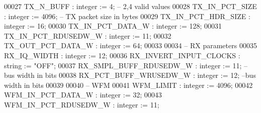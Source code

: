 \begin{DoxyCode}
00027       \textcolor{vhdlchar}{TX_N_BUFF}               \textcolor{vhdlchar}{:} \textcolor{comment}{integer} \textcolor{vhdlchar}{:=} \textcolor{vhdllogic}{}\textcolor{vhdllogic}{4};\textcolor{keyword}{ -- 2,4 valid values}
00028       \textcolor{vhdlchar}{TX_IN_PCT_SIZE}          \textcolor{vhdlchar}{:} \textcolor{comment}{integer} \textcolor{vhdlchar}{:=} \textcolor{vhdllogic}{}\textcolor{vhdllogic}{4096};\textcolor{keyword}{ -- TX packet size in bytes}
00029       \textcolor{vhdlchar}{TX_IN_PCT_HDR_SIZE}      \textcolor{vhdlchar}{:} \textcolor{comment}{integer} \textcolor{vhdlchar}{:=} \textcolor{vhdllogic}{}\textcolor{vhdllogic}{16};
00030       \textcolor{vhdlchar}{TX_IN_PCT_DATA_W}        \textcolor{vhdlchar}{:} \textcolor{comment}{integer} \textcolor{vhdlchar}{:=} \textcolor{vhdllogic}{}\textcolor{vhdllogic}{128};
00031       \textcolor{vhdlchar}{TX_IN_PCT_RDUSEDW_W}     \textcolor{vhdlchar}{:} \textcolor{comment}{integer} \textcolor{vhdlchar}{:=} \textcolor{vhdllogic}{}\textcolor{vhdllogic}{11};
00032       \textcolor{vhdlchar}{TX_OUT_PCT_DATA_W}       \textcolor{vhdlchar}{:} \textcolor{comment}{integer} \textcolor{vhdlchar}{:=} \textcolor{vhdllogic}{}\textcolor{vhdllogic}{64};
00033       
00034 \textcolor{keyword}{      -- RX parameters}
00035       \textcolor{vhdlchar}{RX_IQ_WIDTH}             \textcolor{vhdlchar}{:} \textcolor{comment}{integer} \textcolor{vhdlchar}{:=} \textcolor{vhdllogic}{}\textcolor{vhdllogic}{12};
00036       \textcolor{vhdlchar}{RX_INVERT_INPUT_CLOCKS}  \textcolor{vhdlchar}{:} \textcolor{comment}{string} \textcolor{vhdlchar}{:=} \textcolor{keyword}{"OFF"};
00037       \textcolor{vhdlchar}{RX_SMPL_BUFF_RDUSEDW_W}  \textcolor{vhdlchar}{:} \textcolor{comment}{integer} \textcolor{vhdlchar}{:=} \textcolor{vhdllogic}{}\textcolor{vhdllogic}{11};\textcolor{keyword}{ --bus width in bits }
00038       \textcolor{vhdlchar}{RX_PCT_BUFF_WRUSEDW_W}   \textcolor{vhdlchar}{:} \textcolor{comment}{integer} \textcolor{vhdlchar}{:=} \textcolor{vhdllogic}{}\textcolor{vhdllogic}{12};\textcolor{keyword}{ --bus width in bits }
00039       
00040 \textcolor{keyword}{      -- WFM}
00041       \textcolor{vhdlchar}{WFM_LIMIT}               \textcolor{vhdlchar}{:} \textcolor{comment}{integer} \textcolor{vhdlchar}{:=} \textcolor{vhdllogic}{}\textcolor{vhdllogic}{4096};
00042       \textcolor{vhdlchar}{WFM_IN_PCT_DATA_W}       \textcolor{vhdlchar}{:} \textcolor{comment}{integer} \textcolor{vhdlchar}{:=} \textcolor{vhdllogic}{}\textcolor{vhdllogic}{32};
00043       \textcolor{vhdlchar}{WFM_IN_PCT_RDUSEDW_W}    \textcolor{vhdlchar}{:} \textcolor{comment}{integer} \textcolor{vhdlchar}{:=} \textcolor{vhdllogic}{}\textcolor{vhdllogic}{11};

\end{DoxyCode}
